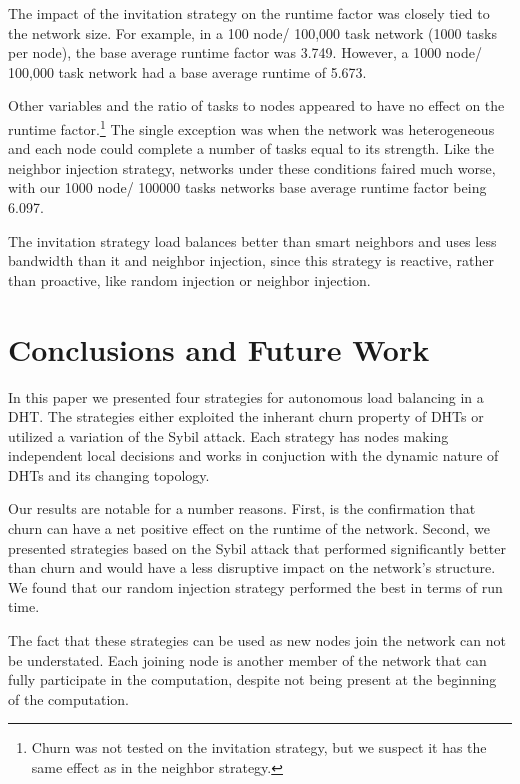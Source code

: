 \documentclass[10pt,conference]{IEEEtran}
\begin{document}
	
	
	The impact of the invitation strategy on the runtime factor was closely tied to the network size.
	For example, in a 100 node/ 100,000 task network (1000 tasks per node), the base average runtime factor was 3.749.
	However, a 1000 node/ 100,000 task network had a base average runtime of 5.673.
	
	Other variables and the ratio of tasks to nodes appeared to have no effect on the runtime factor.\footnote{Churn was not tested on the invitation strategy, but we suspect it has the same effect as in the neighbor strategy.}
	The single exception was when the network was heterogeneous and each node could complete a number of tasks equal to its strength.
	Like the neighbor injection strategy, networks under these conditions faired much worse, with our 1000 node/ 100000 tasks networks base average runtime factor being 6.097.
	
	The invitation strategy load balances better than smart neighbors and uses less bandwidth than it and neighbor injection, since this strategy is reactive, rather than proactive, like random injection or neighbor injection.
	
	\section{Conclusions and Future Work}
	In this paper we presented four strategies for autonomous load balancing in a DHT. 
	The strategies either exploited the inherant churn property of DHTs or utilized a variation of the Sybil attack. 
	Each strategy has nodes making independent local decisions and works in conjuction with the dynamic nature of DHTs and its changing topology.
	
	
	Our results are notable for a number reasons.
	First, is the confirmation that churn can have a net positive effect on the runtime of the network.
	Second, we presented strategies based on the Sybil attack that performed significantly better than churn and would have a less disruptive impact on the network's structure.
	We found that our random injection strategy performed the best in terms of run time.
	
	
	The fact that these strategies can be used as new nodes join the network can not be understated.
	Each joining node is another member of the network that can fully participate in the computation, despite not being present at the beginning of the computation.
	
\end{document}

